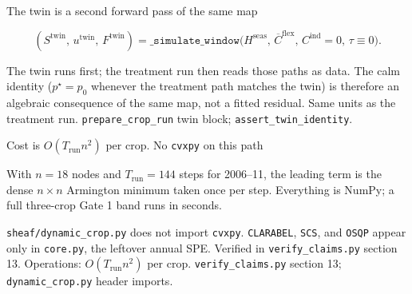 \begin{frame}{The twin is a second forward pass of the same map}

\[
(S^{\mathrm{twin}},\,u^{\mathrm{twin}},\,F^{\mathrm{twin}})
=\texttt{\_simulate\_window}\bigl(H^{\mathrm{seas}},\,
\overline{C}^{\mathrm{flex}},\,
C^{\mathrm{ind}}=0,\,\tau\equiv 0\bigr).
\]

The twin runs first; the treatment run then reads those paths as data. The
calm identity ($p^\star=p_0$ whenever the treatment path matches the twin)
is therefore an algebraic consequence of the same map, not a fitted
residual.
{Same units as the treatment run.}
{\texttt{prepare\_crop\_run} twin block; \texttt{assert\_twin\_identity}.}
\end{frame}

\begin{frame}{Cost is $O(T_{\mathrm{run}}n^2)$ per crop. No \texttt{cvxpy} on this path}

With $n=18$ nodes and $T_{\mathrm{run}}=144$ steps for 2006--11, the
leading term is the dense $n\times n$ Armington minimum taken once per
step. Everything is NumPy; a full three-crop Gate 1 band runs in seconds.

\texttt{sheaf/dynamic\_crop.py} does not import \texttt{cvxpy}.
\texttt{CLARABEL}, \texttt{SCS}, and \texttt{OSQP} appear only in
\texttt{core.py}, the leftover annual SPE. Verified in
\texttt{verify\_claims.py} section 13.
{Operations: $O(T_{\mathrm{run}}n^2)$ per crop.}
{\texttt{verify\_claims.py} section 13; \texttt{dynamic\_crop.py} header
imports.}
\end{frame}

